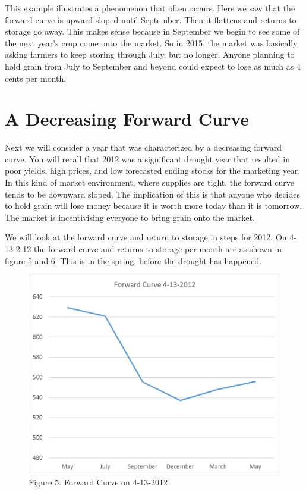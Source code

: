 \documentclass[]{book}
\theoremstyle{definition}
\theoremstyle{definition}
\theoremstyle{remark}
\begin{document}
This example illustrates a phenomenon that often occurs. Here we saw
that the forward curve is upward sloped until September. Then it
flattens and returns to storage go away. This makes sense because in
September we begin to see some of the next year's crop come onto the
market. So in 2015, the market was basically asking farmers to keep
storing through July, but no longer. Anyone planning to hold grain from
July to September and beyond could expect to lose as much as 4 cents per
month.

\section{A Decreasing Forward Curve}\label{a-decreasing-forward-curve}

Next we will consider a year that was characterized by a decreasing
forward curve. You will recall that 2012 was a significant drought year
that resulted in poor yields, high prices, and low forecasted ending
stocks for the marketing year. In this kind of market environment, where
supplies are tight, the forward curve tends to be downward sloped. The
implication of this is that anyone who decides to hold grain will lose
money because it is worth more today than it is tomorrow. The market is
incentivising everyone to bring grain onto the market.

We will look at the forward curve and return to storage in steps for
2012. On 4-13-2-12 the forward curve and returns to storage per month
are as shown in figure 5 and 6. This is in the spring, before the
drought has happened.

\begin{figure}[htbp]
\centering
\includegraphics{Excel-files/PricesSpaceTime/forward-curves_files/image009.png}
\caption{Figure 5. Forward Curve on 4-13-2012}
\end{figure}
\end{document}
